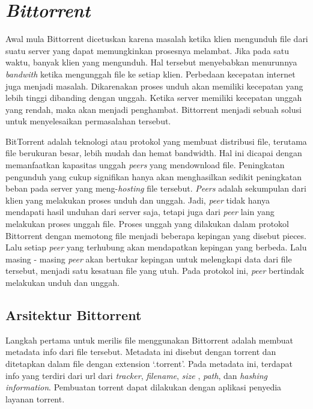 \section{\emph{Bittorrent}}

Awal mula Bittorrent dicetuskan karena masalah ketika klien mengunduh file dari suatu server yang dapat memungkinkan prosesnya melambat. Jika pada satu waktu, banyak klien yang mengunduh. Hal tersebut menyebabkan menurunnya \emph{bandwith} ketika mengunggah file ke setiap klien. Perbedaan kecepatan internet juga menjadi masalah. Dikarenakan proses unduh akan memiliki kecepatan yang lebih tinggi dibanding dengan unggah. Ketika server memiliki kecepatan unggah yang rendah, maka akan menjadi penghambat. Bittorrent menjadi sebuah solusi untuk menyelesaikan permasalahan tersebut.

BitTorrent adalah teknologi atau protokol yang membuat distribusi file, terutama file berukuran besar, lebih mudah dan hemat bandwidth. Hal ini dicapai dengan memanfaatkan kapasitas unggah \emph{peers} yang mendownload file. Peningkatan pengunduh yang cukup signifikan hanya akan menghasilkan sedikit peningkatan beban pada server yang meng-\emph{hosting} file tersebut. \emph{Peers} adalah sekumpulan dari klien yang melakukan proses unduh dan unggah. Jadi, \emph{peer} tidak hanya mendapati hasil unduhan dari server saja, tetapi juga dari \emph{peer} lain yang melakukan proses unggah file. Proses unggah yang dilakukan dalam protokol Bittorrent dengan memotong file menjadi beberapa kepingan yang disebut pieces. Lalu setiap \emph{peer} yang terhubung akan mendapatkan kepingan yang berbeda. Lalu masing - masing \emph{peer} akan bertukar kepingan untuk melengkapi data dari file tersebut, menjadi satu kesatuan file yang utuh. Pada protokol ini, \emph{peer} bertindak melakukan unduh dan unggah.

\subsection{Arsitektur Bittorrent}

Langkah pertama untuk merilis file menggunakan Bittorrent adalah membuat metadata info dari file tersebut. Metadata ini disebut dengan torrent dan ditetapkan dalam file dengan extension `.torrent'. Pada metadata ini, terdapat info yang terdiri dari url dari \emph{tracker}, \emph{filename}, \emph{size} , \emph{path}, dan \emph{hashing information}. Pembuatan torrent dapat dilakukan dengan aplikasi penyedia layanan torrent.

